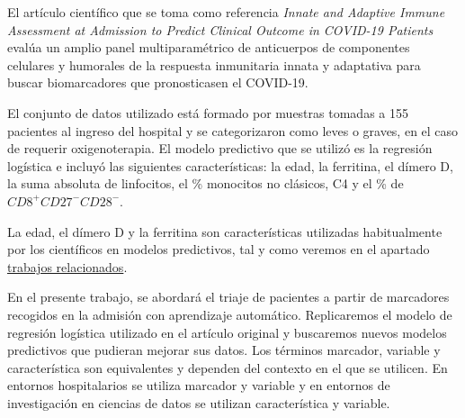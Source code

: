 
El artículo científico que se toma como referencia \textit{Innate and Adaptive Immune Assessment at Admission to Predict Clinical Outcome in COVID-19 Patients}~\cite{sansegundo:2021} evalúa un amplio panel multiparamétrico de anticuerpos de componentes celulares y humorales de la respuesta inmunitaria innata y adaptativa para buscar biomarcadores que pronosticasen el COVID-19.

El conjunto de datos utilizado está formado por muestras tomadas a 155 pacientes al ingreso del hospital y se categorizaron como leves o graves, en el caso de requerir oxigenoterapia. El modelo predictivo que se utilizó es la regresión logística e incluyó las siguientes características: la edad, la ferritina, el dímero D, la suma absoluta de linfocitos, el  \% monocitos no clásicos, C4 y el  \% de $CD8^{+}CD27^{-}CD28^{-}$.

La edad, el dímero D y la ferritina son características utilizadas habitualmente por los científicos en modelos predictivos, tal y como veremos en el apartado \hyperref[trabajosrel]{trabajos relacionados}.

En el presente trabajo, se abordará el triaje de pacientes a partir de marcadores recogidos en la admisión con aprendizaje automático. Replicaremos el modelo de regresión logística utilizado en el artículo original y buscaremos nuevos modelos predictivos que pudieran mejorar sus datos. Los términos marcador, variable y característica son equivalentes y dependen del contexto en el que se utilicen. En entornos hospitalarios se utiliza marcador y variable y en entornos de investigación en ciencias de datos se utilizan característica y variable.